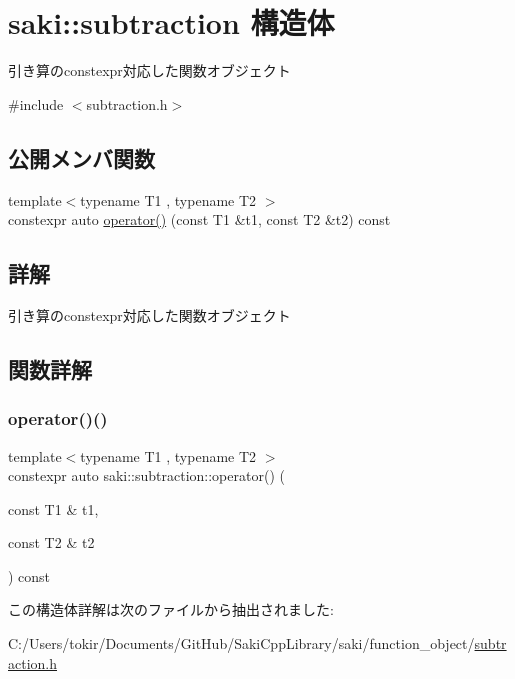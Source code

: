 \hypertarget{structsaki_1_1subtraction}{}\section{saki\+:\+:subtraction 構造体}
\label{structsaki_1_1subtraction}


引き算のconstexpr対応した関数オブジェクト  




{\ttfamily \#include $<$subtraction.\+h$>$}

\subsection*{公開メンバ関数}
\begin{DoxyCompactItemize}
\item 
{\footnotesize template$<$typename T1 , typename T2 $>$ }\\constexpr auto \mbox{\hyperlink{structsaki_1_1subtraction_a6c26b497569ef8b5fd7aa213ca675a2c}{operator()}} (const T1 \&t1, const T2 \&t2) const
\end{DoxyCompactItemize}


\subsection{詳解}
引き算のconstexpr対応した関数オブジェクト 

\subsection{関数詳解}
\mbox{\label{structsaki_1_1subtraction_a6c26b497569ef8b5fd7aa213ca675a2c}} 
\subsubsection{\texorpdfstring{operator()()}{operator()()}}
{\footnotesize\ttfamily template$<$typename T1 , typename T2 $>$ \\
constexpr auto saki\+::subtraction\+::operator() (\begin{DoxyParamCaption}\item[{const T1 \&}]{t1,  }\item[{const T2 \&}]{t2 }\end{DoxyParamCaption}) const\hspace{0.3cm}{\ttfamily [inline]}}



この構造体詳解は次のファイルから抽出されました\+:\begin{DoxyCompactItemize}
\item 
C\+:/\+Users/tokir/\+Documents/\+Git\+Hub/\+Saki\+Cpp\+Library/saki/function\+\_\+object/\mbox{\hyperlink{subtraction_8h}{subtraction.\+h}}\end{DoxyCompactItemize}
